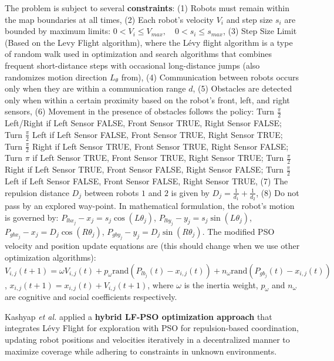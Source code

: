 The problem is subject to several \textbf{constraints}: 
(1) Robots must remain within the map boundaries at all times, 
(2) Each robot’s velocity $V_i$ and step size $s_i$ are bounded by maximum limits: $0 < V_i \leq V_{max}, \quad 0 < s_i \leq s_{max}$, 
(3) Step Size Limit (Based on the Levy Flight algorithm), where the Lévy flight algorithm is a type of random walk used in optimization and search algorithms that combines frequent short-distance steps with occasional long-distance jumps (also randomizes motion direction $L_{\theta}$ from), 
(4) Communication between robots occurs only when they are within a communication range $d$, 
(5) Obstacles are detected only when within a certain proximity based on the robot’s front, left, and right sensors, 
(6) Movement in the presence of obstacles follows the policy: Turn $\frac{\pi}{2}$ Left/Right if Left Sensor FALSE, Front Sensor TRUE, Right Sensor FALSE; Turn $\frac{\pi}{2}$ Left if Left Sensor FALSE, Front Sensor TRUE, Right Sensor TRUE; Turn $\frac{\pi}{2}$ Right if Left Sensor TRUE, Front Sensor TRUE, Right Sensor FALSE; Turn $\pi$ if Left Sensor TRUE, Front Sensor TRUE, Right Sensor TRUE; Turn $\frac{\pi}{2}$ Right if Left Sensor TRUE, Front Sensor FALSE, Right Sensor FALSE; Turn $\frac{\pi}{2}$ Left if Left Sensor FALSE, Front Sensor FALSE, Right Sensor TRUE, 
(7) The repulsion distance $D_j$ between robots $1$ and $2$ is given by $D_j = \frac{1}{d_1} + \frac{1}{d_2}$, 
(8) Do not pass by an explored way-point. 
In mathematical formulation, the robot’s motion is governed by: 
$P_{lbx_j} - x_j = s_j \cos(L\theta_j)$, 
$P_{lby_j} - y_j = s_j \sin(L\theta_j)$, 
$P_{gbx_j} - x_j = D_j \cos(R\theta_j)$, 
$P_{gby_j} - y_j = D_j \sin(R\theta_j)$. 
The modified PSO velocity and position update equations are (this should change when we use other optimization algorithms): 
$V_{i,j}(t+1) = \omega V_{i,j}(t) + p_\omega \text{rand}(P_{lb_j}(t) - x_{i,j}(t)) + n_\omega \text{rand}(P_{gb_j}(t) - x_{i,j}(t))$, 
$x_{i,j}(t+1) = x_{i,j}(t) + V_{i,j}(t+1)$, 
where $\omega$ is the inertia weight, $p_\omega$ and $n_\omega$ are cognitive and social coefficients respectively.

Kashyap \textit{et al.} applied a \textbf{hybrid LF-PSO optimization approach} that integrates Lévy Flight for exploration with PSO for repulsion-based coordination, updating robot positions and velocities iteratively in a decentralized manner to maximize coverage while adhering to constraints in unknown environments.

